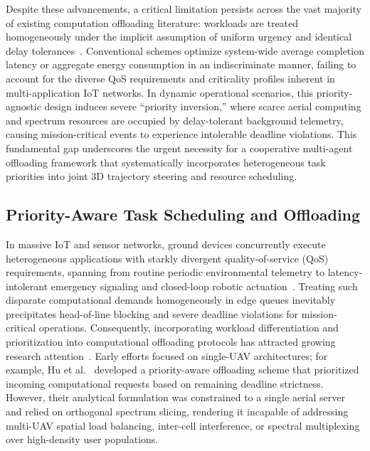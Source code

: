 \documentclass[journal]{IEEEtran}
\begin{document}
Despite these advancements, a critical limitation persists across the vast majority of existing computation offloading literature: workloads are treated homogeneously under the implicit assumption of uniform urgency and identical delay tolerances~\cite{yang2026drl, tariq2024toward, barman2025joint, zhan2026joint}. Conventional schemes optimize system-wide average completion latency or aggregate energy consumption in an indiscriminate manner, failing to account for the diverse QoS requirements and criticality profiles inherent in multi-application IoT networks. In dynamic operational scenarios, this priority-agnostic design induces severe ``priority inversion,'' where scarce aerial computing and spectrum resources are occupied by delay-tolerant background telemetry, causing mission-critical events to experience intolerable deadline violations. This fundamental gap underscores the urgent necessity for a cooperative multi-agent offloading framework that systematically incorporates heterogeneous task priorities into joint 3D trajectory steering and resource scheduling.


\subsection{Priority-Aware Task Scheduling and Offloading}

In massive IoT and sensor networks, ground devices concurrently execute heterogeneous applications with starkly divergent quality-of-service (QoS) requirements, spanning from routine periodic environmental telemetry to latency-intolerant emergency signaling and closed-loop robotic actuation~\cite{hu2020priority, zeng2019accessing}. Treating such disparate computational demands homogeneously in edge queues inevitably precipitates head-of-line blocking and severe deadline violations for mission-critical operations. Consequently, incorporating workload differentiation and prioritization into computational offloading protocols has attracted growing research attention~\cite{hu2020priority, sun2023priority}. Early efforts focused on single-UAV architectures; for example, Hu et al.~\cite{hu2020priority} developed a priority-aware offloading scheme that prioritized incoming computational requests based on remaining deadline strictness. However, their analytical formulation was constrained to a single aerial server and relied on orthogonal spectrum slicing, rendering it incapable of addressing multi-UAV spatial load balancing, inter-cell interference, or spectral multiplexing over high-density user populations.
\end{document}
